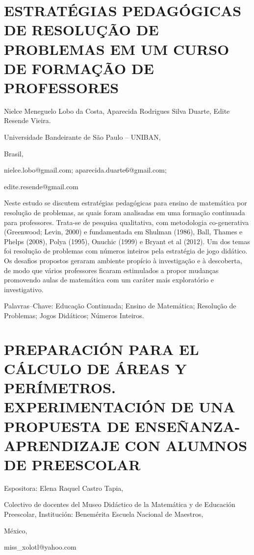 \section{ESTRATÉGIAS PEDAGÓGICAS DE RESOLUÇÃO DE PROBLEMAS EM UM CURSO DE
FORMAÇÃO DE PROFESSORES}

\begin{datos}

Nielce Meneguelo Lobo da Costa, Aparecida Rodrigues Silva Duarte,
Edite Resende Vieira. 

Universidade Bandeirante de São Paulo – UNIBAN,

Brasil,

nielce.lobo@gmail.com; aparecida.duarte6@gmail.com;

edite.resende@gmail.com 

\end{datos}

Neste estudo se discutem estratégias pedagógicas para ensino de matemática
por resolução de problemas, as quais foram analisadas em uma formação
continuada para professores. Trata-se de pesquisa qualitativa, com
metodologia co-generativa (Greenwood; Levin, 2000) e fundamentada
em Shulman (1986), Ball, Thames e Phelps (2008), Polya (1995), Onuchic
(1999) e Bryant et al (2012). Um dos temas foi resolução de problemas
com números inteiros pela estratégia de jogo didático. Os desafios
propostos geraram ambiente propício à investigação e à descoberta,
de modo que vários professores ficaram estimulados a propor mudanças
promovendo aulas de matemática com um caráter mais exploratório e
investigativo. 

Palavras–Chave: Educação Continuada; Ensino de Matemática; Resolução
de Problemas; Jogos Didáticos; Números Inteiros.


\section{PREPARACIÓN PARA EL CÁLCULO DE ÁREAS Y PERÍMETROS. EXPERIMENTACIÓN
DE UNA PROPUESTA DE ENSEÑANZA-APRENDIZAJE CON ALUMNOS DE PREESCOLAR}

\begin{datos}

Espositora: Elena Raquel Castro Tapia,

Colectivo de docentes del Museo Didáctico de la Matemática y de Educación
Preescolar, Institución: Benemérita Escuela Nacional de Maestros,

México,

miss\_xolotl@yahoo.com

\end{datos}

